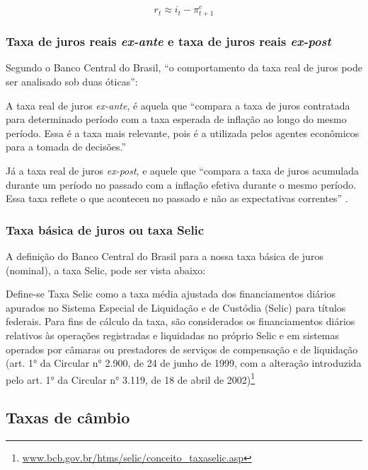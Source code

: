 \documentclass[
	10pt,				%
	openright,			%
	twoside,			%
	a5paper,			%
	english,			%
	french,				%
	spanish,			%
	brazil				%
	]{abntex2}
\renewenvironment{quote}
  {\small\list{}{\rightmargin=0.1cm \leftmargin=4cm}%
   \item\relax}
  {\endlist}
\begin{document}
\[r_t\approx i_t - \pi_{t+1}^e\]

\subsubsection{\texorpdfstring{Taxa de juros reais \emph{ex-ante} e taxa
de juros reais
\emph{ex-post}}{Taxa de juros reais ex-ante e taxa de juros reais ex-post}}\label{taxa-de-juros-reais-ex-ante-e-taxa-de-juros-reais-ex-post}

Segundo o Banco Central do Brasil, ``o comportamento da taxa real de
juros pode ser analisado sob duas óticas'':

A taxa real de juros \emph{ex-ante}, é aquela que ``compara a taxa de
juros contratada para determinado período com a taxa esperada de
inflação ao longo do mesmo período. Essa é a taxa mais relevante, pois é
a utilizada pelos agentes econômicos para a tomada de decisões.''
\cite[p.~52]{ri}

Já a taxa real de juros \emph{ex-post}, e aquele que ``compara a taxa de
juros acumulada durante um período no passado com a inflação efetiva
durante o mesmo período. Essa taxa reflete o que aconteceu no passado e
não as expectativas correntes'' \cite[p.~52-53]{ri}.

\subsubsection{Taxa básica de juros ou taxa
Selic}\label{taxa-buxe1sica-de-juros-ou-taxa-selic}

A definição do Banco Central do Brasil para a nossa taxa básica de juros
(nominal), a taxa Selic, pode ser vista abaixo:

\begin{quote}
Define-se Taxa Selic como a taxa média ajustada dos financiamentos
diários apurados no Sistema Especial de Liquidação e de Custódia (Selic)
para títulos federais. Para fins de cálculo da taxa, são considerados os
financiamentos diários relativos às operações registradas e liquidadas
no próprio Selic e em sistemas operados por câmaras ou prestadores de
serviços de compensação e de liquidação (art. 1° da Circular n° 2.900,
de 24 de junho de 1999, com a alteração introduzida pelo art. 1° da
Circular n° 3.119, de 18 de abril de 2002)\footnote{\href{http://www.bcb.gov.br/htms/selic/conceito_taxaselic.asp}{www.bcb.gov.br/htms/selic/conceito\_taxaselic.asp}}
\end{quote}

\subsection{Taxas de câmbio}\label{taxas-de-cuxe2mbio}
\end{document}
